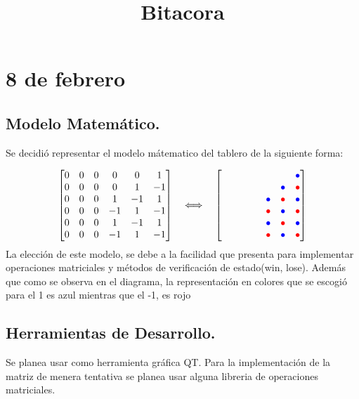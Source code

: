 \documentclass[12pt,a4paper]{article}
\title{Bitacora}
\date{}
\begin{document}
 
\maketitle


\section{8 de febrero}

\subsection{Modelo Matemático.}

Se decidió representar el modelo mátematico del tablero de la siguiente forma:



\[
\begin{bmatrix}
0 & 0 & 0 & 0 &  0 &  1 \\
0 & 0 & 0 & 0 &  1 & -1 \\
0 & 0 & 0 &  1 & -1 &  1 \\
0 & 0 & 0 & -1 &  1 & -1 \\
0 & 0 & 0 &  1 & -1 &  1 \\
0 & 0 & 0 & -1 &  1 & -1
\end{bmatrix}
\quad \Longleftrightarrow \quad
\begin{bmatrix}
\phantom{\bullet} & \phantom{\bullet} & \phantom{\bullet} & \phantom{\bullet} & \phantom{\bullet} & \textcolor{blue}{\bullet} \\
\phantom{\bullet} & \phantom{\bullet} & \phantom{\bullet} & \phantom{\bullet} & \textcolor{blue}{\bullet} & \textcolor{red}{\bullet} \\
\phantom{\bullet} & \phantom{\bullet} & \phantom{\bullet} & \textcolor{blue}{\bullet} & \textcolor{red}{\bullet} & \textcolor{blue}{\bullet} \\
\phantom{\bullet} & \phantom{\bullet} & \phantom{\bullet} & \textcolor{red}{\bullet} & \textcolor{blue}{\bullet} & \textcolor{red}{\bullet} \\
\phantom{\bullet} & \phantom{\bullet} & \phantom{\bullet} & \textcolor{blue}{\bullet} & \textcolor{red}{\bullet} & \textcolor{blue}{\bullet} \\
\phantom{\bullet} & \phantom{\bullet} & \phantom{\bullet} & \textcolor{red}{\bullet} & \textcolor{blue}{\bullet} & \textcolor{red}{\bullet}
\end{bmatrix}
\]
La elección de este modelo, se debe a la facilidad que presenta para implementar operaciones matriciales y métodos de verificación de estado(win, lose).
Además que como se observa en el diagrama, la representación en colores que se escogió para el 1 es azul mientras que el -1, es rojo

\subsection{Herramientas de Desarrollo.}

Se planea usar como herramienta gráfica QT.
Para la implementación de la matriz de menera tentativa se planea usar alguna libreria de operaciones matriciales.
\end{document}
